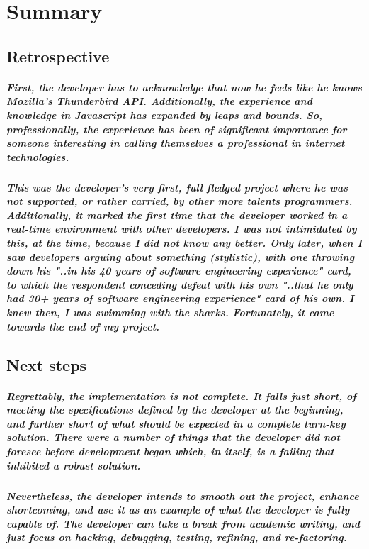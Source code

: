 \chapter{Summary}

\section{Retrospective}

\paragraph{First, the developer has to acknowledge that \emph{now} he feels like he knows Mozilla's Thunderbird API. Additionally, the experience and knowledge in Javascript has expanded by leaps and bounds. So, professionally, the experience has been of significant importance for someone interesting in calling themselves a professional in internet technologies.}

\paragraph{This was the developer's very first, full fledged project where he was not supported, or rather carried, by other more talents programmers. Additionally, it marked the first time that the developer worked in a real-time environment with other developers. I was not intimidated by this, at the time, because I did not know any better. Only later, when I saw developers arguing about something (stylistic), with one throwing down his "..in his 40 years of software engineering experience" card, to which the respondent conceding defeat with his own "..that he only had 30+ years of software engineering experience" card of his own. I knew then, I was swimming with the sharks. Fortunately, it came towards the end of my project.}

\section{Next steps}

\paragraph{Regrettably, the implementation is not complete. It falls just short, of meeting the specifications defined by the developer at the beginning, and further short of what should be expected in a complete turn-key solution. There were a number of things that the developer did not foresee before development began which, in itself, is a failing that inhibited a robust solution.}

\paragraph{Nevertheless, the developer intends to smooth out the project, enhance shortcoming, and use it as an example of what the developer is fully capable of. The developer can take a break from academic writing, and just focus on hacking, debugging, testing, refining, and re-factoring.}